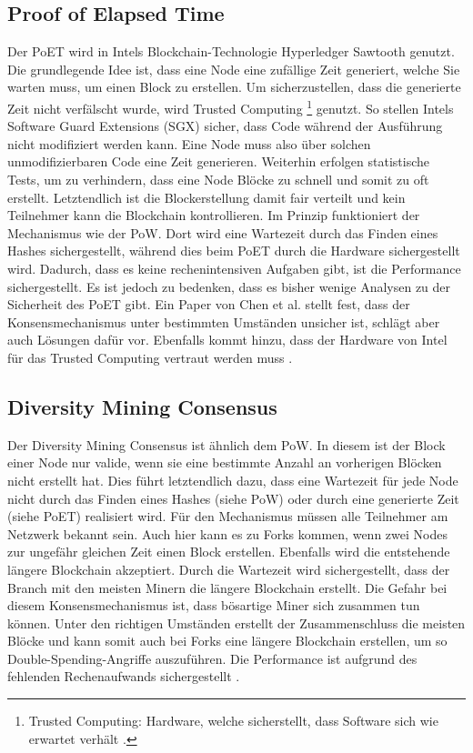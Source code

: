 \subsection{Proof of Elapsed Time}
Der PoET wird in Intels Blockchain-Technologie Hyperledger Sawtooth genutzt. Die grundlegende Idee ist, dass eine Node eine zufällige Zeit generiert, welche Sie warten muss, um einen Block zu erstellen. Um sicherzustellen, dass die generierte Zeit nicht verfälscht wurde, wird Trusted Computing \footnote{Trusted Computing: Hardware, welche sicherstellt, dass Software sich wie erwartet verhält \cite{MitchellTrustedComputing2005}.} genutzt. So stellen Intels Software Guard Extensions (SGX) sicher, dass Code während der Ausführung nicht modifiziert werden kann. Eine Node muss also über solchen unmodifizierbaren Code eine Zeit generieren. Weiterhin erfolgen statistische Tests, um zu verhindern, dass eine Node Blöcke zu schnell und somit zu oft erstellt. Letztendlich ist die Blockerstellung damit fair verteilt und kein Teilnehmer kann die Blockchain kontrollieren. Im Prinzip funktioniert der Mechanismus wie der \acs{PoW}. Dort wird eine Wartezeit durch das Finden eines Hashes sichergestellt, während dies beim PoET durch die Hardware sichergestellt wird. Dadurch, dass es keine rechenintensiven Aufgaben gibt, ist die Performance sichergestellt. Es ist jedoch zu bedenken, dass es bisher wenige Analysen zu der Sicherheit des PoET gibt. Ein Paper von Chen et al. stellt fest, dass der Konsensmechanismus unter bestimmten Umständen unsicher ist, schlägt aber auch Lösungen dafür vor. Ebenfalls kommt hinzu, dass der Hardware von Intel für das Trusted Computing vertraut werden muss \cite{ChenSecurityAnalysisProofofElapsedTime2017}.

\subsection{Diversity Mining Consensus}
Der Diversity Mining Consensus ist ähnlich dem \acs{PoW}. In diesem ist der Block einer Node nur valide, wenn sie eine bestimmte Anzahl an vorherigen Blöcken nicht erstellt hat. Dies führt letztendlich dazu, dass eine Wartezeit für jede Node nicht durch das Finden eines Hashes (siehe \acs{PoW}) oder durch eine generierte Zeit (siehe PoET) realisiert wird. Für den Mechanismus müssen alle Teilnehmer am Netzwerk bekannt sein. Auch hier kann es zu Forks kommen, wenn zwei Nodes zur ungefähr gleichen Zeit einen Block erstellen. Ebenfalls wird die entstehende längere Blockchain akzeptiert. Durch die Wartezeit wird sichergestellt, dass der Branch mit den meisten Minern die längere Blockchain erstellt. Die Gefahr bei diesem Konsensmechanismus ist, dass bösartige Miner sich zusammen tun können. Unter den richtigen Umständen erstellt der Zusammenschluss die meisten Blöcke und kann somit auch bei Forks eine längere Blockchain erstellen, um so Double-Spending-Angriffe auszuführen. Die Performance ist aufgrund des fehlenden Rechenaufwands sichergestellt \cite{GreenspanMultiChainPrivateBlockchain2015}\cite{CachinBlockchainConsensusProtocols2017}.

